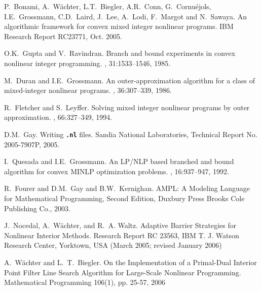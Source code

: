 \begin{PageSummary}
\end{PageSummary}
\begin{thebibliography}{10}


P.~Bonami, A.~W\"achter, L.T.~Biegler, A.R.~Conn, G.~Cornu\'ejols,
I.E.~Grossmann, C.D.~Laird, J.~Lee, A.~Lodi, F.~Margot and
N.~Sawaya.
\newblock An algorithmic framework for convex mixed integer nonlinear programs. IBM Research Report RC23771, Oct. 2005.

O.K.~Gupta and V.~Ravindran.
\newblock Branch and bound experiments in convex nonlinear integer programming.
, 31:1533--1546, 1985.


M.~Duran and I.E.~Grossmann.
\newblock An outer-approximation algorithm for a class of mixed-integer nonlinear programs.
, 36:307--339, 1986.

R.~Fletcher and S.~Leyffer.
\newblock Solving mixed integer nonlinear programs by outer approximation.
, 66:327--349, 1994.

D.M.~Gay.
\newblock Writing \texttt{\bf .nl} files.
\newblock Sandia National Laboratories, Technical Report No. 2005-7907P, 2005.

I.~Quesada and I.E.~Grossmann.
\newblock An {LP/NLP} based branched and bound algorithm for convex {MINLP} optimization problems.
, 16:937--947, 1992.

R.~Fourer and D.M.~Gay and B.W.~Kernighan.
\newblock AMPL: A Modeling Language for Mathematical
Programming, Second Edition,
\newblock Duxbury Press Brooks Cole Publishing Co., 2003.


J.~Nocedal, A.~W\"achter, and R.~A. Waltz.
\newblock Adaptive Barrier Strategies for Nonlinear Interior Methods.
\newblock Research Report RC 23563, IBM T. J. Watson Research Center, Yorktown, USA (March 2005; revised January 2006)

A.~W\"achter and L.~T.~Biegler.
\newblock On the Implementation of a Primal-Dual Interior Point Filter Line Search Algorithm for Large-Scale Nonlinear Programming.
\newblock Mathematical Programming 106(1), pp. 25-57, 2006
\end{thebibliography}
